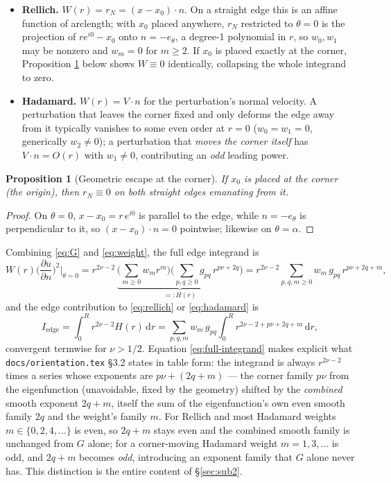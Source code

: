 \documentclass[11pt]{article}
\newtheorem{proposition}{Proposition}
\theoremstyle{remark}
\newcommand{\dd}{\,\mathrm{d}}
\newcommand{\pdn}[1]{\frac{\partial #1}{\partial n}}
\newcommand{\code}[1]{\texttt{#1}}
\begin{document}
\begin{itemize}
\item \textbf{Rellich.} $W(r) = r_N = (x-x_0)\cdot n$. On a straight edge this is an affine
function of arclength; with $x_0$ placed anywhere, $r_N$ restricted to $\theta=0$ is the
projection of $r e^{i0}-x_0$ onto $n=-e_\theta$, a degree-1 polynomial in $r$, so $w_0,w_1$ may be
nonzero and $w_m=0$ for $m\ge2$. If $x_0$ is placed exactly at the corner, Proposition
\ref{prop:escape} below shows $W\equiv0$ identically, collapsing the whole integrand to zero.
\item \textbf{Hadamard.} $W(r) = V\cdot n$ for the perturbation's normal velocity. A perturbation
that leaves the corner fixed and only deforms the edge away from it typically vanishes to some
even order at $r=0$ ($w_0=w_1=0$, generically $w_2\neq0$); a perturbation that \emph{moves the
corner itself} has $V\cdot n = O(r)$ with $w_1\neq0$, contributing an \emph{odd} leading power.
\end{itemize}

\begin{proposition}[Geometric escape at the corner]\label{prop:escape}
If $x_0$ is placed at the corner (the origin), then $r_N\equiv0$ on both straight edges
emanating from it.
\end{proposition}
\begin{proof}
On $\theta=0$, $x-x_0 = r\,e^{i0}$ is parallel to the edge, while $n=-e_\theta$ is perpendicular
to it, so $(x-x_0)\cdot n=0$ pointwise; likewise on $\theta=\alpha$.
\end{proof}

Combining \eqref{eq:G} and \eqref{eq:weight}, the full edge integrand is
\begin{equation}\label{eq:full-integrand}
  W(r)\Big(\pdn u\Big)^{\!2}\bigg|_{\theta=0}
  = r^{2\nu-2}\,\underbrace{\Big(\sum_{m\ge0} w_m r^m\Big)\Big(\sum_{p,q\ge0} g_{pq}\,r^{p\nu+2q}\Big)}_{=:H(r)}
  = r^{2\nu-2}\sum_{p,q,m\ge0} w_m\,g_{pq}\, r^{p\nu+2q+m},
\end{equation}
and the edge contribution to \eqref{eq:rellich} or \eqref{eq:hadamard} is
\begin{equation}\label{eq:Iedge}
  I_{\mathrm{edge}} = \int_0^R r^{2\nu-2} H(r)\dd r
  = \sum_{p,q,m} w_m\,g_{pq} \int_0^R r^{2\nu-2+p\nu+2q+m}\dd r,
\end{equation}
convergent termwise for $\nu>1/2$. Equation \eqref{eq:full-integrand} makes explicit what
\code{docs/orientation.tex} \S3.2 states in table form: the integrand is always
$r^{2\nu-2}$ times a series whose exponents are $p\nu+(2q+m)$ --- the corner family $p\nu$ from
the eigenfunction (unavoidable, fixed by the geometry) shifted by the \emph{combined} smooth
exponent $2q+m$, itself the sum of the eigenfunction's own even smooth family $2q$ and the
weight's family $m$. For Rellich and most Hadamard weights $m\in\{0,2,4,\dots\}$ is even, so
$2q+m$ stays even and the combined smooth family is unchanged from $G$ alone; for a
corner-moving Hadamard weight $m=1,3,\dots$ is odd, and $2q+m$ becomes \emph{odd}, introducing an
exponent family that $G$ alone never has. This distinction is the entire content of
\S\ref{sec:sub2}.
\end{document}
